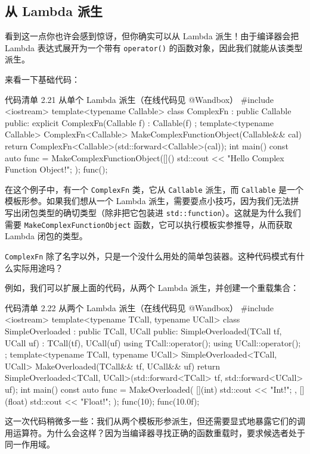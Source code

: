 \begin{codebox}
\section{从 Lambda 派生}

看到这一点你也许会感到惊讶，但你确实可以从 Lambda 派生！由于编译器会把 Lambda 表达式展开为一个带有 \texttt{operator()} 的函数对象，因此我们就能从该类型派生。

来看一下基础代码：

\begin{codeboxt}{代码清单 2.21 从单个 Lambda 派生（在线代码见 @Wandbox）}
#include <iostream>
template<typename Callable>
class ComplexFn : public Callable {
public:
explicit ComplexFn(Callable f) : Callable(f) {}
};
template<typename Callable>
ComplexFn<Callable> MakeComplexFunctionObject(Callable&& cal) {
return ComplexFn<Callable>(std::forward<Callable>(cal));
}
int main() {
const auto func = MakeComplexFunctionObject([]() {
std::cout << "Hello Complex Function Object!";
});
func();
}
\end{codeboxt}

在这个例子中，有一个 \texttt{ComplexFn} 类，它从 \texttt{Callable} 派生，而 \texttt{Callable} 是一个模板形参。如果我们想从一个 Lambda 派生，需要耍点小技巧，因为我们无法拼写出闭包类型的确切类型（除非把它包装进 \texttt{std::function}）。这就是为什么我们需要 \texttt{MakeComplexFunctionObject} 函数，它可以执行模板实参推导，从而获取 Lambda 闭包的类型。

\texttt{ComplexFn} 除了名字以外，只是一个没什么用处的简单包装器。这种代码模式有什么实际用途吗？

例如，我们可以扩展上面的代码，从两个 Lambda 派生，并创建一个重载集合：

\begin{codeboxt}{代码清单 2.22 从两个 Lambda 派生（在线代码见 @Wandbox）}
#include <iostream>
template<typename TCall, typename UCall>
class SimpleOverloaded : public TCall, UCall {
public:
SimpleOverloaded(TCall tf, UCall uf) : TCall(tf), UCall(uf) {}
using TCall::operator();
using UCall::operator();
};
template<typename TCall, typename UCall>
SimpleOverloaded<TCall, UCall> MakeOverloaded(TCall&& tf, UCall&& uf) {
return SimpleOverloaded<TCall, UCall>(std::forward<TCall> tf,
std::forward<UCall> uf);
}
int main() {
const auto func = MakeOverloaded(
[](int) { std::cout << "Int!\n"; },
[](float) { std::cout << "Float!\n"; }
);
func(10);
func(10.0f);
}
\end{codeboxt}

这一次代码稍微多一些：我们从两个模板形参派生，但还需要显式地暴露它们的调用运算符。为什么会这样？因为当编译器寻找正确的函数重载时，要求候选者处于同一作用域。


\end{codebox}
